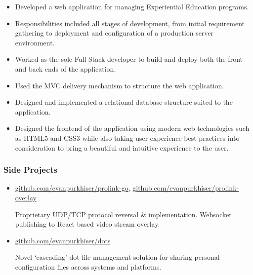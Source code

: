 \documentclass[letterpaper,10pt]{article}
\begin{document}
\begin{itemize}
\tightlist{}
\item
  Developed a web application for managing Experiential Education
  programs.
\item
  Responsibilities included all stages of development, from initial
  requirement gathering to deployment and configuration of a production
  server environment.
\item
  Worked as the sole Full-Stack developer to build and deploy both the front
  and back ends of the application.
\item
  Used the MVC delivery mechanism to structure the web application.
\item
  Designed and implemented a relational database structure suited to the
  application.
\item
  Designed the frontend of the application using modern web technologies such
  as HTML5 and CSS3 while also taking user experience best practices into
  consideration to bring a beautiful and intuitive experience to the user.
\end{itemize}

\subsubsection{Side Projects}

\begin{itemize}
\item
  \href{https://github.com/evanpurkhiser/prolink-go}{github.com/evanpurkhiser/prolink-go},
  \href{https://github.com/evanpurkhiser/prolink-overlay}{github.com/evanpurkhiser/prolink-overlay}

  Proprietary UDP/TCP protocol reversal \& implementation. Websocket
  publishing to React based video stream overlay.
\item
  \href{https://github.com/evanpurkhiser/dots}{github.com/evanpurkhiser/dots}

  Novel `cascading' dot file management solution for sharing personal
  configuration files across systems and platforms.
\end{itemize}
\end{document}
